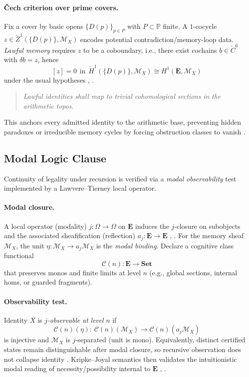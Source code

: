 \documentclass[12pt]{amsart}
\theoremstyle{plain}
\begin{document}
\paragraph{Čech criterion over prime covers.}
Fix a cover by basic opens $\{D(p)\}_{p\in P}$ with $P\subset\mathbb{P}$ finite. A $1$-cocycle $z\in \check{Z}^1(\{D(p)\},\mathscr{M}_X)$ encodes potential contradiction/memory-loop data. \emph{Lawful memory} requires $z$ to be a coboundary, i.e., there exist cochains $b\in \check{C}^{0}$ with $\delta b=z$, hence
\[
[\!z\!]=0\ \ \text{in}\ \ \check{H}^1(\{D(p)\},\mathscr{M}_X)\cong H^1(\mathbf{E},\mathscr{M}_X)
\]
under the usual hypotheses \cite[III.4]{hartshorne1977algebraic}, \cite[VI]{maclane1992sheaves}.

\begin{quote}
\textit{Lawful identities shall map to trivial cohomological sections in the arithmetic topos.}
\end{quote}

This anchors every admitted identity to the arithmetic base, preventing hidden paradoxes or irreducible memory cycles by forcing obstruction classes to vanish \cite{johnstone2002elephant,maclane1992sheaves}.

\subsection{Modal Logic Clause}

Continuity of legality under recursion is verified via a \emph{modal observability} test implemented by a Lawvere–Tierney local operator.

\paragraph{Modal closure.}
A local operator (modality) $j:\Omega\!\to\!\Omega$ on $\mathbf{E}$ induces the $j$-closure on subobjects and the associated sheafification (reflection) $a_j:\mathbf{E}\!\to\!\mathbf{E}$ \cite[VI.8]{maclane1992sheaves}, \cite[C1]{johnstone2002elephant}. For the memory sheaf $\mathscr{M}_X$, the unit $\eta:\mathscr{M}_X\to a_j\mathscr{M}_X$ is the \emph{modal binding}. Declare a cognitive class functional
\[
\mathcal{C}(n):\mathbf{E}\longrightarrow \mathbf{Set}
\]
that preserves monos and finite limits at level $n$ (e.g., global sections, internal homs, or guarded fragments).

\paragraph{Observability test.}
Identity $X$ is \emph{$j$-observable at level $n$} if
\[
\mathcal{C}(n)(\eta):\ \mathcal{C}(n)(\mathscr{M}_X)\longrightarrow \mathcal{C}(n)(a_j\mathscr{M}_X)
\]
is injective and $\mathscr{M}_X$ is $j$-separated (unit is mono). Equivalently, distinct certified states remain distinguishable after modal closure, so recursive observation does not collapse identity \cite{maclane1992sheaves,awodey2004topos}. Kripke–Joyal semantics then validates the intuitionistic modal reading of necessity/possibility internal to $\mathbf{E}$ \cite[VI]{maclane1992sheaves}, \cite{johnstone2002elephant}.
\end{document}
